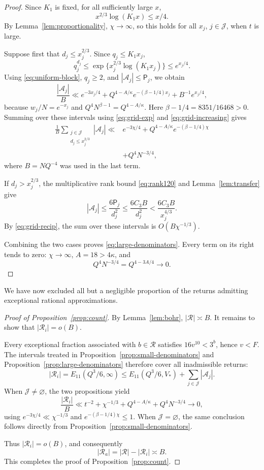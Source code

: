 \documentclass[11pt,reqno]{amsart}
\theoremstyle{definition}
\theoremstyle{plain}
\theoremstyle{definition}
\theoremstyle{remark}
\newcommand{\RR}{\mathcal R}
\newcommand{\Bad}{\mathcal A}
\begin{document}
\begin{proof}
Since $K_1$ is fixed, for all sufficiently
large $x$,
\[
 x^{2/3}\log(K_1x)\le x/4.
\]
By Lemma~\ref{lem:proportionality},
$\chi\to\infty$, so this holds for all
$x_j$, $j\in\mathcal J$, when $t$ is large.

Suppose first that $d_j\le x_j^{2/3}$.
Since $q_j\le K_1x_j$,
\[
 q_j^{d_j}
 \le\exp\{x_j^{2/3}\log(K_1x_j)\}
 \le e^{x_j/4}.
\]
Using \eqref{eq:uniform-block},
$q_j\ge2$, and $|\Bad_j|\le\mathsf P_j$,
we obtain
\[
 \frac{|\Bad_j|}{B}
 \ll e^{-3x_j/4}
 +Q^{4-A/\kappa}e^{-(\beta-1/4)x_j}
 +B^{-1}e^{x_j/4},
\]
because $w_j/N=e^{-x_j}$ and
$Q^4N^{\beta-1}=Q^{4-A/\kappa}$.
Here $\beta-1/4=8351/16468>0$.
Summing over these intervals using
\eqref{eq:grid-exp} and
\eqref{eq:grid-increasing} gives
\[
 \begin{aligned}
 \frac1B
 \sum_{\substack{j\in\mathcal J\\
                 d_j\le x_j^{2/3}}}
 |\Bad_j|
 \ll{}&e^{-3\chi/4}
 +Q^{4-A/\kappa}e^{-(\beta-1/4)\chi}\\
 &+Q^4N^{-3/4},
 \end{aligned}
\]
where $B=NQ^{-4}$ was used in the last term.

If $d_j>x_j^{2/3}$, the multiplicative
rank bound \eqref{eq:rank120} and
Lemma~\ref{lem:transfer} give
\[
 |\Bad_j|
 \le\frac{6\mathsf P_j}{d_j^2}
 \le\frac{6C_3B}{d_j^2}
 <\frac{6C_3B}{x_j^{4/3}}.
\]
By \eqref{eq:grid-recip}, the sum over
these intervals is $O(B\chi^{-1/3})$.

Combining the two cases proves
\eqref{eq:large-denominators}.
Every term on its right tends to zero:
$\chi\to\infty$, $A=18>4\kappa$, and
\[
 Q^4N^{-3/4}=Q^{4-3A/4}\longrightarrow0.
\]
\end{proof}

We have now excluded all but a negligible
proportion of the returns admitting exceptional
rational approximations.

\begin{proof}[Proof of Proposition~\ref{prop:count}]
By Lemma~\ref{lem:bohr}, $|\RR|\asymp B$.
It remains to show that $|\RR_i|=o(B)$.

Every exceptional fraction associated with
$b\in\RR$ satisfies $16v^{10}<3^b$,
hence $v<F$. The intervals treated in
Proposition~\ref{prop:small-denominators}
and Proposition~\ref{prop:large-denominators}
therefore cover all inadmissible returns:
\[
 |\RR_i|=E_{11}(Q^3/6,\infty)
 \le E_{11}(Q^3/6,V_*)
 +\sum_{j\in\mathcal J}|\Bad_j|.
\]
When $\mathcal J\ne\varnothing$, the two
propositions yield
\[
 \frac{|\RR_i|}{B}
 \ll t^{-2}+\chi^{-1/3}
 +Q^{4-A/\kappa}+Q^4N^{-3/4}
 \longrightarrow0,
\]
using $e^{-3\chi/4}\ll\chi^{-1/3}$ and
$e^{-(\beta-1/4)\chi}\le1$.
When $\mathcal J=\varnothing$, the same
conclusion follows directly from
Proposition~\ref{prop:small-denominators}.

Thus $|\RR_i|=o(B)$, and consequently
\[
 |\RR_a|=|\RR|-|\RR_i|\asymp B.
\]
This completes the proof of
Proposition~\ref{prop:count}.
\end{proof}
\end{document}
